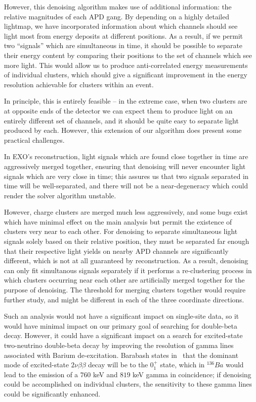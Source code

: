 However, this denoising algorithm makes use of additional information: the relative magnitudes of each APD gang.  By depending on a highly detailed lightmap, we have incorporated information about which channels should see light most from energy deposits at different positions.   As a result, if we permit two ``signals'' which are simultaneous in time, it should be possible to separate their energy content by comparing their positions to the set of channels which see more light.  This would allow us to produce anti-correlated energy measurements of individual clusters, which should give a significant improvement in the energy resolution achievable for clusters within an event.

In principle, this is entirely feasible -- in the extreme case, when two clusters are at opposite ends of the detector we can expect them to produce light on an entirely different set of channels, and it should be quite easy to separate light produced by each.  However, this extension of our algorithm does present some practical challenges.

In EXO's reconstruction, light signals which are found close together in time are aggressively merged together, ensuring that denoising will never encounter light signals which are very close in time; this assures us that two signals separated in time will be well-separated, and there will not be a near-degeneracy which could render the solver algorithm unstable.

However, charge clusters are merged much less aggressively, and some bugs exist which have minimal effect on the main analysis but permit the existence of clusters very near to each other.  For denoising to separate simultaneous light signals solely based on their relative position, they must be separated far enough that their respective light yields on nearby APD channels are significantly different, which is not at all guaranteed by reconstruction.  As a result, denoising can only fit simultanous signals separately if it performs a re-clustering process in which clusters occurring near each other are artificially merged together for the purpose of denoising.  The threshold for merging clusters together would require further study, and might be different in each of the three coordinate directions.

Such an analysis would not have a significant impact on single-site data, so it would have minimal impact on our primary goal of searching for double-beta decay.  However, it could have a significant impact on a search for excited-state two-neutrino double-beta decay by improving the resolution of gamma lines associated with Barium de-excitation.  Barabash states in~\cite{Barabash2010} that the dominant mode of excited-state $2\nu \beta\beta$ decay will be to the $0^{+}_1$ state, which in $^{136}Ba$ would lead to the emission of a $760$ keV and $819$ keV gamma in coincidence; if denoising could be accomplished on individual clusters, the sensitivity to these gamma lines could be significantly enhanced.

